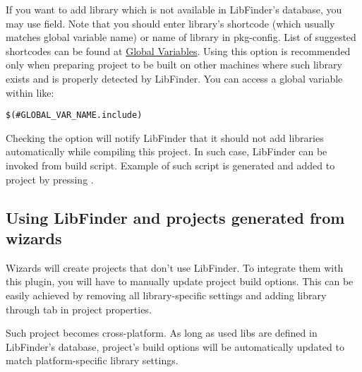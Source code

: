If you want to add library which is not available in LibFinder's database, you may use  field. Note that you should enter library's shortcode (which usually matches global variable name) or name of library in pkg-config. List of suggested shortcodes can be found at \href{https://wiki.codeblocks.org/index.php?title=Recommended_global_variables}{Global Variables}. Using this option is recommended only when preparing project to be built on other machines where such library exists and is properly detected by LibFinder. You can access a global variable within \codeblocks like:

\begin{lstlisting}
$(#GLOBAL_VAR_NAME.include)
\end{lstlisting}

Checking the  option will notify LibFinder that it should not add libraries automatically while compiling this project. In such case, LibFinder can be invoked from build script. Example of such script is generated and added to project by pressing .

\subsection{Using LibFinder and projects generated from wizards}

Wizards will create projects that don't use LibFinder. To integrate them with this plugin, you will have to manually update project build options. This can be easily achieved by removing all library-specific settings and adding library through  tab in project properties.

Such project becomes cross-platform. As long as used libs are defined in LibFinder's database, project's build options will be automatically updated to match platform-specific library settings.


